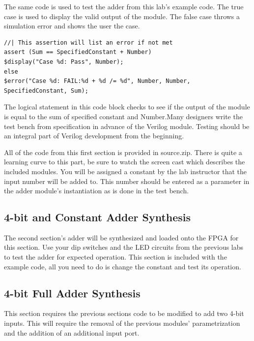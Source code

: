   The same code is used to test the adder from this lab's example code. The true case is used to display the valid output of the module. The false case throws a simulation error and shows the user the case. 
  \begin{lstlisting}[caption={Assertion Example from test bench}]
//| This assertion will list an error if not met
assert (Sum == SpecifiedConstant + Number)
$display("Case %d: Pass", Number);
else
$error("Case %d: FAIL:%d + %d /= %d", Number, Number, SpecifiedConstant, Sum);
  \end{lstlisting} 
  The logical statement in this code block checks to see if the output of the module is equal to the sum of specified constant and Number.Many designers write the test bench from specification in advance of the Verilog module. Testing should be an integral part of Verilog development from the beginning.

  All of the code from this first section is provided in source.zip. There is quite a learning curve to this part, be sure to watch the screen cast which describes the included modules. You will be assigned a constant by the lab instructor that the input number will be added to. This number should be entered as a parameter in the adder module's instantiation as is done in the test bench.

\subsection{4-bit and Constant Adder Synthesis}
  The second section's adder will be synthesized and loaded onto the FPGA for this section. Use your dip switches and the LED circuits from the previous labs to test the adder for expected operation. This section is included with the example code, all you need to do is change the constant and test its operation.  

\subsection{4-bit Full Adder Synthesis}
  This section requires the previous sections code to be modified to add two 4-bit inputs. This will require the removal of the previous modules' parametrization and the addition of an additional input port. 

